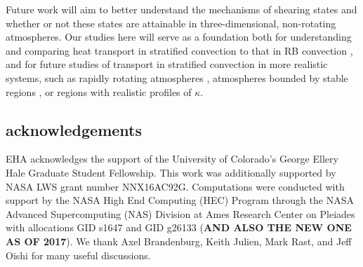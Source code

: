 \documentclass[aps, prl, twocolumn, nofootinbib, groupedaddress, amsfonts, amssymb, amsmath]{revtex4-1}
\begin{document}
Future work will aim to better understand the mechanisms of shearing states and
whether or not these states are attainable in three-dimensional, non-rotating atmospheres.  Our studies
here will serve as a foundation both for understanding and comparing heat transport in stratified convection
to that in RB convection \cite{johnston&doering2009}, and for future studies of transport in stratified
convection in more realistic systems, such as rapidly rotating atmospheres \cite{julien&all2012},
atmospheres bounded by stable regions \cite{hurlburt&all1986}, 
or regions with realistic profiles of $\kappa$.



\subsection{acknowledgements}
EHA acknowledges the support of the University of Colorado's George 
Ellery Hale Graduate Student Fellowship.
This work was additionally supported by  NASA LWS grant number NNX16AC92G.  
Computations were conducted 
with support by the NASA High End Computing (HEC) Program through the NASA 
Advanced Supercomputing (NAS) Division at Ames Research Center on Pleiades
with allocations GID s1647 and GID g26133 (\textbf{AND ALSO THE NEW ONE AS OF 2017}).
We thank Axel Brandenburg, Keith Julien, Mark Rast, and Jeff Oishi for many useful discussions.


\end{document}
